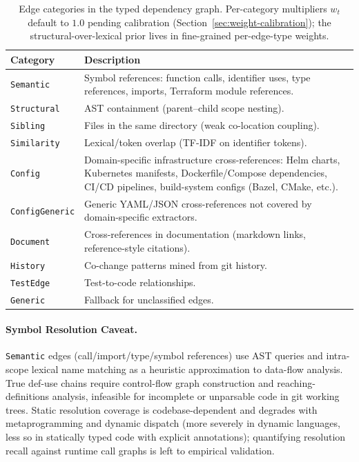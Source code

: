 \documentclass[11pt, a4paper]{article}
\begin{document}
\begin{table}[h]
\centering
\small
\begin{tabular}{lp{8cm}}
\toprule
\textbf{Category} & \textbf{Description} \\
\midrule
\texttt{Semantic}      & Symbol references: function calls, identifier uses, type references, imports, Terraform module references. \\
\texttt{Structural}    & AST containment (parent--child scope nesting). \\
\texttt{Sibling}       & Files in the same directory (weak co-location coupling). \\
\texttt{Similarity}    & Lexical/token overlap (TF-IDF on identifier tokens). \\
\texttt{Config}        & Domain-specific infrastructure cross-references: Helm charts, Kubernetes manifests, Dockerfile/Compose dependencies, CI/CD pipelines, build-system configs (Bazel, CMake, etc.). \\
\texttt{ConfigGeneric} & Generic YAML/JSON cross-references not covered by domain-specific extractors. \\
\texttt{Document}      & Cross-references in documentation (markdown links, reference-style citations). \\
\texttt{History}       & Co-change patterns mined from git history. \\
\texttt{TestEdge}      & Test-to-code relationships. \\
\texttt{Generic}       & Fallback for unclassified edges. \\
\bottomrule
\end{tabular}
\caption{Edge categories in the typed dependency graph. Per-category multipliers $w_t$ default to $1.0$ pending calibration (Section~\ref{sec:weight-calibration}); the structural-over-lexical prior lives in fine-grained per-edge-type weights.}
\label{tab:edge-categories}
\end{table}

\paragraph{Symbol Resolution Caveat.} \texttt{Semantic} edges (call/import/type/symbol references) use AST queries and intra-scope lexical name matching as a heuristic approximation to data-flow analysis. True def-use chains require control-flow graph construction and reaching-definitions analysis, infeasible for incomplete or unparsable code in git working trees. Static resolution coverage is codebase-dependent and degrades with metaprogramming and dynamic dispatch (more severely in dynamic languages, less so in statically typed code with explicit annotations); quantifying resolution recall against runtime call graphs is left to empirical validation.
\end{document}
